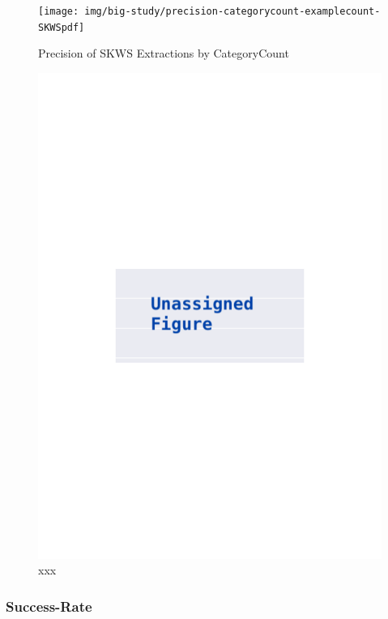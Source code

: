 \documentclass[\myrootdir/main.tex]{subfiles}
\begin{document}
\begin{figure}[htbp]
	\centering
	\begin{minipage}{0.45\textwidth}
		\centering
		\texttt{[image: img/big-study/precision-categorycount-examplecount-SKWSpdf]}
		\caption{Precision of SKWS Extractions by CategoryCount}
		\label{fig:precision-categorycount-examplecount-skws}
	\end{minipage}\hfill
	\begin{minipage}{0.45\textwidth}
		\centering
		\includegraphics[width=\textwidth, clip]{img/big-study/xxx.pdf}
		\caption{xxx}
		\label{fig:xxx}
	\end{minipage}
\end{figure}

\subsubsection{Success-Rate}
\end{document}
